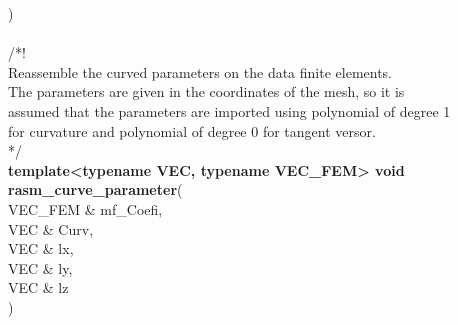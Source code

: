 \documentclass[a4paper]{report}
\newcommand\tab[1][1cm]{\hspace*{#1}}
\begin{document}
{\tab		) \\
\\
/*!\\
\tab	Reassemble the curved parameters on the data finite elements.\\
\tab	The parameters are given in the coordinates of the mesh, so it is\\
\tab	assumed that the parameters are imported using polynomial of degree 1\\
\tab 	for curvature and polynomial of degree 0 for tangent versor.\\
*/\\
\textbf{
template<typename VEC, typename VEC\_\-FEM>
void rasm\_\-curve\_\-parameter}(\\
\tab		VEC\_\-FEM \& mf\_\-Coefi,\\
\tab		VEC \& Curv,\\
\tab		VEC \& lx,\\
\tab		VEC \& ly,\\
\tab		VEC \& lz\\
\tab	)\\

}
\end{document}
